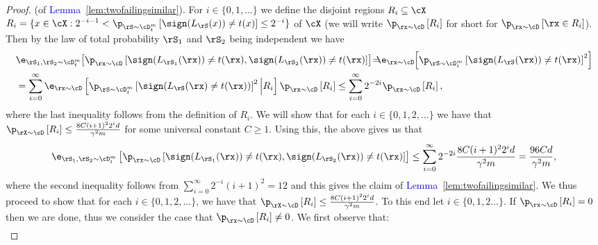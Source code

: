 \begin{proof}(of \textcolor{blue}{Lemma}~\ref{lem:twofailingsimilar}).
    For $ i\in \{  0,1,\ldots \}  $ we define the disjoint regions  $ R_{i}\subseteq \cX $ $ R_{i}=\{x\in \cX:2^{-i-1}< \p_{\rS\sim\cD^{m}_{t}}\left[ \sign(L_{\rS}(x)) \not = t(x)  \right]\leq 2^{-i}  \}$  of $ \cX $ (we will write $ \p_{\rx\sim \cD}\left[R_{i}\right] $ for short for $ \p_{\rx\sim\cD}\left[\rx\in R_{i}\right] $). Then by the law of total probability $ \rS_{1} $ and $ \rS_{2} $ being independent we have
    \begin{align}\label{eq:twofailingsimilar2}
        &\e_{\rS_{1},\rS_{2}\sim \cD^{m}_{t}}\negmedspace\left[\p_{\rx\sim\cD}\left[   \sign(L_{\rS_{1}}(\rx))\not=t(\rx),\sign(L_{\rS_{2}}(\rx))\not=t(\rx)\right]\right]
        \negmedspace=\negmedspace\negmedspace\negmedspace\e_{\rx\sim\cD}\negmedspace\left[\p_{\rS\sim \cD^{m}_{t}}\left[   \sign(L_{\rS}(\rx))\not=t(\rx)\right]^{2}\right]\nonumber
        \\
        &= \sum_{i=0}^{\infty}  \e_{\rx\sim\cD}\left[\p_{\rS\sim \cD^{m}_{t}}\left[   \sign(L_{\rS}(\rx)\not=t(\rx))\right]^{2} \Big| R_{i}\right]\p_{\rx\sim\cD}\left[R_{i}\right]
        \leq
        \sum_{i=0}^{\infty}  2^{-2i}\p_{\rx\sim\cD}\left[R_{i}\right],
    \end{align}
    where the last inequality follows from the definition of $ R_{i}$. We will show that for each $ i\in\{  0,1,2,\ldots\}  $ we have that $ \p_{\rX\sim\cD}\left[R_{i}\right] \leq \frac{8C(i+1)^{2}2^{i}d}{\gamma^{2}m}$ for some universal constant   $ C\geq1 $. Using this, the above gives us that 
    \begin{align*}
        \e_{\rS_{1},\rS_{2}\sim \cD^{m}_{t}}\left[\p_{\rx\sim\cD}\left[   \sign(L_{\rS_{1}}(\rx))\not=t(\rx),\sign(L_{\rS_{2}}(\rx))\not=t(\rx)\right]\right]
        \leq
        \sum_{i=0}^{\infty}  2^{-2i}\frac{8C(i+1)^{2}2^{i}d}{\gamma^{2}m}
        =\frac{96Cd}{\gamma^{2}m},
    \end{align*}
    where the second inequality follows from $ \sum_{i=0}^{\infty}2^{-i}(i+1)^{2} =12$ and this gives the claim of \textcolor{blue}{Lemma}~\ref{lem:twofailingsimilar}. 
    We thus proceed to show that for each $ i\in\{  0,1,2,\ldots\}  $, we have that $ \p_{\rX\sim\cD}\left[R_{i}\right] \leq \frac{8C(i+1)^{2}2^{i}d}{\gamma^{2}m}$. 
    To this end let $ i\in\{  0,1,2\ldots\}.$ If $ \p_{\rx\sim\cD}\left[R_{i}\right]=0 $ then we are done, thus we consider the case that $ \p_{\rx\sim\cD}\left[R_{i}\right]\not=0 $.
    We first observe that:
    \begin{align*}

\end{align*}
\end{proof}
